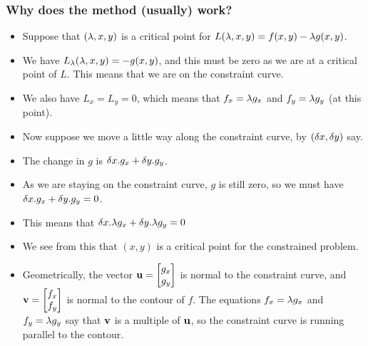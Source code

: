 \documentclass[9pt]{beamer}
\begin{document}
\begin{frame}[t]
 \frametitle{Why does the method (usually) work?}
 \begin{itemize}
  \item<1-> Suppose that $(\lambda,x,y)$ is a critical point for
   $L(\lambda,x,y)=f(x,y)-\lambda g(x,y)$.
  \item<2-> We have $L_\lambda(\lambda,x,y)=-g(x,y)$, and this must be zero as
   we are at a critical point of $L$.  This means that we are on the
   constraint curve.
  \item<3-> We also have $L_x=L_y=0$, which means that $f_x=\lambda g_x$
   and $f_y=\lambda g_y$ (at this point).
  \item<4-> Now suppose we move a little way along the constraint
   curve, by $(\delta x,\delta y)$ say.
  \item<5-> The change in $g$ is $\delta x.g_x+\delta y.g_y$.
  \item<6-> As we are staying on the constraint curve, $g$ is still
   zero, so we must have $\delta x.g_x+\delta y.g_y=0$.  
  \item<7-> This means that
   $\delta x.\lambda g_x+\delta y.\lambda g_y=0$
  \item<8-> We see from this that $(x,y)$ is a critical point for the
   constrained problem.
  \item<9-> Geometrically, the vector $\mathbf{u}=\left[\begin{matrix} g_x\\ g_y\end{matrix}\right]$ is normal
   to the constraint curve, and $\mathbf{v}=\left[\begin{matrix} f_x\\ f_y\end{matrix}\right]$ is normal to
   the contour of $f$.  The equations $f_x=\lambda g_x$ and $f_y=\lambda g_y$
   say that $\mathbf{v}$ is a multiple of $\mathbf{u}$, so the constraint curve is
   running parallel to the contour.
 \end{itemize}
\end{frame}
\end{document}
